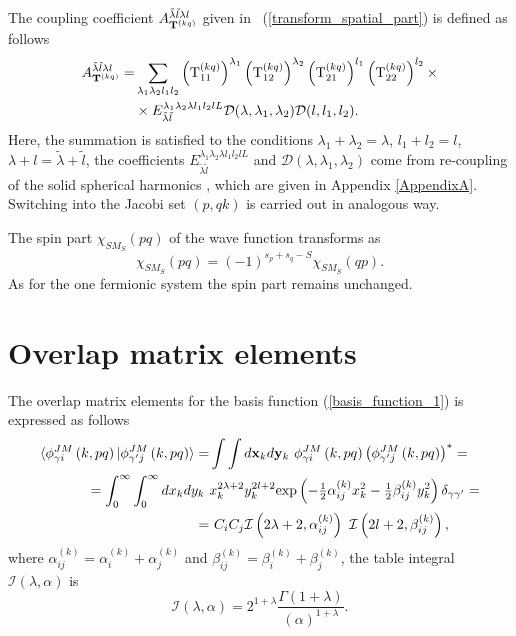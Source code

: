 \documentclass[
12pt, %
oneside, %
english, %
onehalfspacing, %
onehalfspacing, %
headsepline, %
]{MastersDoctoralThesis} %
\begin{document}
The coupling coefficient $A^{\tilde{\lambda} \tilde{l} \lambda l}_{{\bf T}^{(kq)} }$  given in ~(\ref{transform_spatial_part}) is defined as follows
 \begin{align}
 A^{\tilde{\lambda} \tilde{l} \lambda l}_{{\bf T}^{(kq)} } = & \sum_{\lambda_1 \lambda_2 l_1 l_2} 
\left({\rm T}_{11}^{(kq)} \right)^{\lambda_1} 
\left({\rm T}_{12}^{(kq)} \right)^{\lambda_2} 
\left({\rm T}_{21}^{(kq)} \right)^{l_1} 
\left({\rm T}_{22}^{(kq)} \right)^{l_2} 
\times \nonumber
\\
& \times {E}^{\lambda_1 \lambda_2 \lambda l_1 l_2 l L}_{\tilde{\lambda} \tilde{l} } \mathcal{D}(\lambda,\lambda_1,\lambda_2) \mathcal{D}(l,l_1,l_2).    
\label{trans_coef}
\end{align}
Here, the summation is satisfied to the conditions $\lambda_1+\lambda_2=\lambda$, $l_1+l_2=l$, $\lambda+l=\tilde{\lambda}+\tilde{l}$, the coefficients ${E}^{\lambda_1 \lambda_2 \lambda l_1 l_2 l L}_{\tilde{\lambda} \tilde{l} }$ and $\mathcal{D}(\lambda,\lambda_1,\lambda_2)$ come from re-coupling of the solid spherical harmonics , which are given in Appendix \ref{AppendixA}. Switching into the Jacobi set $(p,qk)$ is carried out in analogous way.

The spin part $\chi_{SM_S}(pq)$ of the wave function transforms as
\begin{equation}
\chi_{SM_S}(pq) = (-1)^{s_p+s_q-S} \chi_{SM_S}(qp).
\end{equation}
As for the one fermionic system the spin part remains unchanged.

\section{Overlap matrix elements}
The overlap matrix elements for the basis function (\ref{basis_function_1}) is expressed as follows
\begin{align}
\langle \phi^{ J M}_{\gamma i}\left(k, pq \right) \vert 
\phi^{ J M}_{\gamma^{\prime}j}\left(k, pq \right) \rangle=&
 \int \int d{\bf x}_k d{\bf y}_k 
 ~\phi^{ J M}_{\gamma i}\left(k, pq \right) 
 \left( \phi^{ J M}_{\gamma^{\prime} j}\left(k, pq \right) \right)^{*}
 = \label{overlap_in_basic_set}
\\ 
=\int_0^\infty \int_0^\infty  dx_k dy_k~ & x_k^{2\lambda+2}y_k^{2 l +2} {\rm exp}\left( - \tfrac{1}{2}\alpha^{(k)}_{ij} x^2_k - \tfrac{1}{2} \beta^{(k)}_{ij} y^2_k \right) \delta_{\gamma \gamma'} =
 \nonumber \\ 
=&~ 
 C_i C_j
\mathcal{I} \left( 2\lambda+2,\alpha_{ij}^{(k)} \right)~ \mathcal{I} \left(2l+2,\beta_{ij}^{(k)} \right) ,\nonumber
\end{align} 
where
$
\alpha_{ij}^{(k)}=\alpha_{i}^{(k)}+\alpha_{j}^{(k)}$ and $
\beta_{ij}^{(k)}=\beta_{i}^{(k)}+\beta_{j}^{(k)}
$,
the table integral $\mathcal{I}(\lambda, \alpha)$ is  
\begin{equation}
\mathcal{I} \left( \lambda,\alpha\right)=
 2^{1+\lambda}\frac{\Gamma \left( 1+\lambda \right)  }{ \left( \alpha \right) ^{1+\lambda}} .
\label{table_integral_1}
\end{equation}
\end{document}
